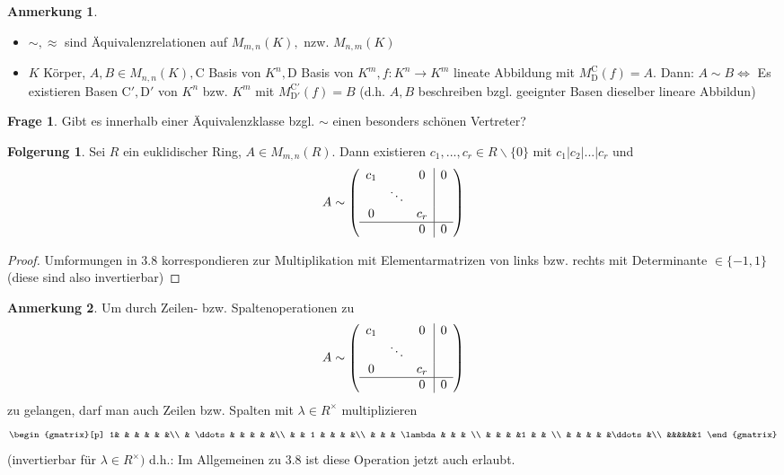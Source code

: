 \documentclass[a4paper, titlepage]{article}
\theoremstyle{definition}
\newtheorem*{anm}{Anmerkung}
\newtheorem*{fg}{Folgerung}
\newtheorem*{frage}{Frage}
\begin{document}
\begin{anm}
    \begin{itemize}
        \item $\sim, \approx$ sind Äquivalenzrelationen auf $M_{m,n}(K),$ nzw. $M_{n,m}(K)$
        \item $K$ Körper, $A,B\in M_{n,n}(K), \mathrm{C}$ Basis von $K^n,\mathrm{D}$ Basis von $K^m,f:K^n\longrightarrow K^m $ lineate Abbildung mit $M_{\mathrm{D}}^{\mathrm{C}}(f)=A$. Dann: $A\sim B\Leftrightarrow $ Es existieren Basen $\mathrm{C'},\mathrm{D'}$ von $K^n$ bzw. $K^m$ mit $M_{\mathrm{D'}}^{\mathrm{C'}}(f)=B$ (d.h. $A,B$ beschreiben bzgl. geeignter Basen dieselber lineare Abbildun)
    \end{itemize}
\end{anm}
\begin{frage}
    Gibt es innerhalb einer Äquivalenzklasse bzgl. $\sim$ einen besonders schönen Vertreter?
\end{frage}
\begin{fg}
    Sei $R$ ein euklidischer Ring, $A\in M_{m,n}(R).$ Dann existieren $c_1,...,c_r\in R\backslash\{0\}$ mit $c_1|c_2|...|c_r$ und 
    $$A\sim \left(\begin{array}{ccc|c}
        c_1& &0&0\\
        & \ddots & &\\
        0& &c_r& \\
        \hline & & 0& 0
    \end{array}\right)$$
\end{fg}
\begin{proof}
    Umformungen in 3.8 korrespondieren zur Multiplikation mit Elementarmatrizen von links bzw. rechts mit Determinante $\in\{-1,1\}$ (diese sind also invertierbar)
\end{proof}
\begin{anm}
    Um durch Zeilen- bzw. Spaltenoperationen zu 
    $$A\sim \left(\begin{array}{ccc|c}
        c_1& &0&0\\
        & \ddots & &\\
        0& &c_r& \\
        \hline & & 0& 0
    \end{array}\right)$$
    zu gelangen, darf man auch Zeilen bzw. Spalten mit $\lambda \in R^{\times } $ multiplizieren 
    $$\begin{gmatrix}[p]
        1& & & & & &\\
        & \ddots  & & & & &\\
        & & 1 & & & &\\
        & & & \lambda & & & \\
        & & & &1 & & \\
        & & & & &\ddots &\\
        &&&&&&1
    \end{gmatrix}$$
    (invertierbar für $\lambda \in R^{\times})$ 
    d.h.: Im Allgemeinen zu 3.8 ist diese Operation jetzt auch erlaubt.
\end{anm}
\end{document}

